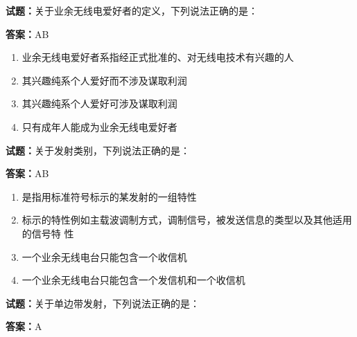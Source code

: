 \documentclass{ctexbook}
\begin{document}




\vspace{1em}

\textbf{试题：}关于业余无线电爱好者的定义，下列说法正确的是： 

\textbf{答案：}AB 

\begin{enumerate}[leftmargin=3em]
  \item 业余无线电爱好者系指经正式批准的、对无线电技术有兴趣的人 

  \item 其兴趣纯系个人爱好而不涉及谋取利润 

  \item 其兴趣纯系个人爱好可涉及谋取利润 

  \item 只有成年人能成为业余无线电爱好者 

\end{enumerate}





\vspace{1em}

\textbf{试题：}关于发射类别，下列说法正确的是： 

\textbf{答案：}AB 

\begin{enumerate}[leftmargin=3em]
  \item 是指用标准符号标示的某发射的一组特性 

  \item 标示的特性例如主载波调制方式，调制信号，被发送信息的类型以及其他适用的信号特
性 

  \item 一个业余无线电台只能包含一个收信机 

  \item 一个业余无线电台只能包含一个发信机和一个收信机 

\end{enumerate}





\vspace{1em}

\textbf{试题：}关于单边带发射，下列说法正确的是： 

\textbf{答案：}A 
\end{document}
